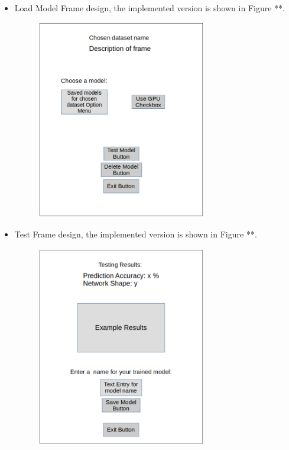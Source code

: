 \documentclass[./project-report/src/latex/project-report.tex]{subfiles}
\begin{document}
\begin{itemize}
    \pagebreak

    \item Load Model Frame design, the implemented version is shown in Figure **.
        \begin{figure}[h!]
        \centering
        \includegraphics[width=0.7\textwidth]{./project-report/src/images/load-model-frame-design.png}
        \end{figure}
    
    \pagebreak
    
    \item Test Frame design, the implemented version is shown in Figure **.
        \begin{figure}[h!]
        \centering
        \includegraphics[width=0.7\textwidth]{./project-report/src/images/testing-frame-design.png}
        \end{figure}
\end{itemize}
\end{document}
